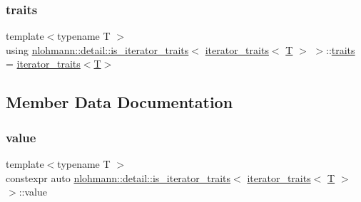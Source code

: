 \subsubsection{\texorpdfstring{traits}{traits}}
{\footnotesize\ttfamily template$<$typename T $>$ \\
using \mbox{\hyperlink{structnlohmann_1_1detail_1_1is__iterator__traits}{nlohmann\+::detail\+::is\+\_\+iterator\+\_\+traits}}$<$ \mbox{\hyperlink{structnlohmann_1_1detail_1_1iterator__traits}{iterator\+\_\+traits}}$<$ \mbox{\hyperlink{_keyboard_event_8h_adf1f3edb9115acb0a1e04209b7a9937b}{T}} $>$ $>$\+::\mbox{\hyperlink{structnlohmann_1_1detail_1_1is__iterator__traits_3_01iterator__traits_3_01_t_01_4_01_4_a1cbceaaa83a3ad294c3cb66b9df48e78}{traits}} =  \mbox{\hyperlink{structnlohmann_1_1detail_1_1iterator__traits}{iterator\+\_\+traits}}$<$\mbox{\hyperlink{_keyboard_event_8h_adf1f3edb9115acb0a1e04209b7a9937b}{T}}$>$\hspace{0.3cm}{\ttfamily [private]}}



\subsection{Member Data Documentation}
\mbox{\label{structnlohmann_1_1detail_1_1is__iterator__traits_3_01iterator__traits_3_01_t_01_4_01_4_ac2711760b352b8921accc6609957dc90}} 
\subsubsection{\texorpdfstring{value}{value}}
{\footnotesize\ttfamily template$<$typename T $>$ \\
constexpr auto \mbox{\hyperlink{structnlohmann_1_1detail_1_1is__iterator__traits}{nlohmann\+::detail\+::is\+\_\+iterator\+\_\+traits}}$<$ \mbox{\hyperlink{structnlohmann_1_1detail_1_1iterator__traits}{iterator\+\_\+traits}}$<$ \mbox{\hyperlink{_keyboard_event_8h_adf1f3edb9115acb0a1e04209b7a9937b}{T}} $>$ $>$\+::value\hspace{0.3cm}{\ttfamily [static]}}

